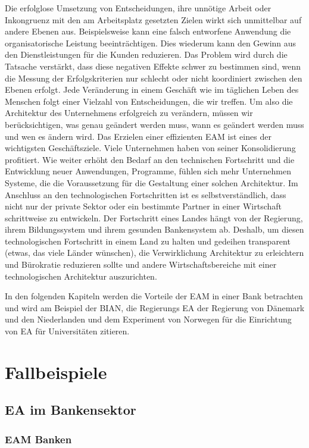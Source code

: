 \documentclass[
	A4paper,
	DIV=9,
	BCOR7mm,
	smallheadings,
	headinclude,
	footinclude,
	headsepline,
	parindent,
	german,
	captions=tableheading,
	abstracton
	]{scrreprt}
\begin{document}
Die erfolglose Umsetzung von Entscheidungen, ihre unnötige Arbeit oder Inkongruenz mit den am Arbeitsplatz gesetzten Zielen wirkt sich unmittelbar auf andere Ebenen aus. Beispielsweise kann eine falsch entworfene Anwendung die organisatorische Leistung beeinträchtigen. Dies wiederum kann den Gewinn aus den Dienstleistungen für die Kunden reduzieren.
Das Problem wird durch die Tatsache verstärkt, dass diese negativen Effekte schwer zu bestimmen sind, wenn die Messung der Erfolgskriterien nur schlecht oder nicht koordiniert zwischen den Ebenen erfolgt.
Jede Veränderung in einem Geschäft wie im täglichen Leben des Menschen folgt einer Vielzahl von Entscheidungen, die wir treffen.
Um also die Architektur des Unternehmens erfolgreich zu verändern, müssen wir berücksichtigen, was genau geändert werden muss, wann es geändert werden muss und wen es ändern wird.
Das Erzielen einer effizienten EAM ist eines der wichtigsten Geschäftsziele. Viele Unternehmen haben von seiner Konsolidierung profitiert. Wie weiter erhöht den Bedarf an den technischen Fortschritt und die Entwicklung neuer Anwendungen, Programme, fühlen sich mehr Unternehmen Systeme, die die Voraussetzung für die Gestaltung einer solchen Architektur.
Im Anschluss an den technologischen Fortschritten ist es selbstverständlich, dass nicht nur der private Sektor oder ein bestimmte Partner in einer Wirtschaft schrittweise zu entwickeln. Der Fortschritt eines Landes hängt von der Regierung, ihrem Bildungssystem und ihrem gesunden Bankensystem ab.
Deshalb, um diesen technologischen Fortschritt in einem Land zu halten und gedeihen transparent (etwas, das viele Länder wünschen), die Verwirklichung Architektur zu erleichtern und Bürokratie reduzieren sollte und andere Wirtschaftsbereiche mit einer technologischen Architektur auszurichten.

In den folgenden Kapiteln werden die Vorteile der EAM in einer Bank betrachten und wird am Beispiel der BIAN, die Regierungs EA der Regierung von Dänemark und den Niederlanden und dem Experiment von Norwegen für die Einrichtung von EA für Universitäten zitieren.


\chapter{Fallbeispiele}
\section{EA im Bankensektor}
\subsection{EAM Banken}
\end{document}
